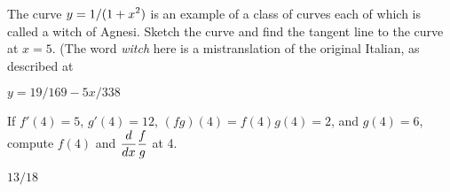 \begin{exercises}
\begin{exercise} The curve $\displaystyle y=1/(1+x^2)$ is an example of a class of
curves each of which is called a {\dfont witch of
Agnesi}. 
Sketch the curve and find the tangent line to the curve at
$x= 5$. (The word {\em witch\/} here is a mistranslation of the
original Italian, as described at
\begin{answer} $y=19/169-5x/338$
\end{answer}\end{exercise}
 
\begin{exercise} If $f'(4) = 5$, $g'(4) = 12$, $(fg)(4)= f(4)g(4)=2$, and $g(4) = 6$,
compute $f(4)$ and $\displaystyle{d\over dx}{f\over g}$ at 4.
\begin{answer} $13/18$
\end{answer}\end{exercise}

\end{exercises}

